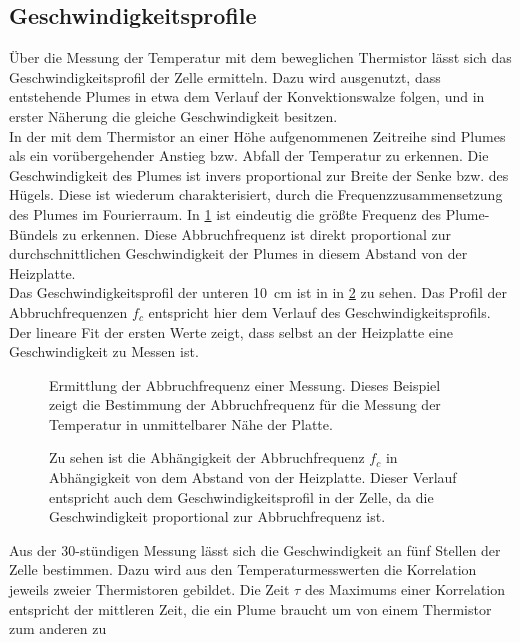 \subsection{Geschwindigkeitsprofile}
Über die Messung der Temperatur mit dem beweglichen Thermistor lässt sich das Geschwindigkeitsprofil der Zelle ermitteln.
Dazu wird ausgenutzt, dass entstehende Plumes in etwa dem Verlauf der Konvektionswalze folgen, und in erster Näherung die gleiche Geschwindigkeit besitzen.
\\
In der mit dem Thermistor an einer Höhe aufgenommenen Zeitreihe sind Plumes als ein vorübergehender Anstieg bzw. Abfall der Temperatur zu erkennen. 
Die Geschwindigkeit des Plumes ist invers proportional zur Breite der Senke bzw. des Hügels.
Diese ist wiederum charakterisiert, durch die Frequenzzusammensetzung des Plumes im Fourierraum.
In \cref{fig:abbruch} ist eindeutig die größte Frequenz des Plume-Bündels zu erkennen. Diese Abbruchfrequenz ist direkt proportional zur durchschnittlichen Geschwindigkeit der Plumes in diesem Abstand von der Heizplatte.
\\
Das Geschwindigkeitsprofil der unteren \SI{10}{\centi\meter} ist in in \cref{fig:vprof_freq} zu sehen. 
Das Profil der Abbruchfrequenzen $f_c$ entspricht hier dem Verlauf des Geschwindigkeitsprofils.
Der lineare Fit der ersten Werte zeigt, dass selbst an der Heizplatte eine Geschwindigkeit zu Messen ist.
\\
\begin{figure}
	\caption{Ermittlung der Abbruchfrequenz einer Messung. Dieses Beispiel zeigt die Bestimmung der Abbruchfrequenz für die Messung der Temperatur in unmittelbarer Nähe der Platte. }\label{fig:abbruch}
\end{figure}
\begin{figure}
	\caption{Zu sehen ist die Abhängigkeit der Abbruchfrequenz $f_c$ in Abhängigkeit von dem Abstand von der Heizplatte. Dieser Verlauf entspricht auch dem Geschwindigkeitsprofil in der Zelle, da die Geschwindigkeit proportional zur Abbruchfrequenz ist.}\label{fig:vprof_freq}
\end{figure}
Aus der 30-stündigen Messung lässt sich die Geschwindigkeit an fünf Stellen der Zelle bestimmen. Dazu wird aus den Temperaturmesswerten die Korrelation jeweils zweier Thermistoren gebildet.
Die Zeit $\tau$ des Maximums einer Korrelation entspricht der mittleren Zeit, die ein Plume braucht um von einem Thermistor zum anderen zu 


%


